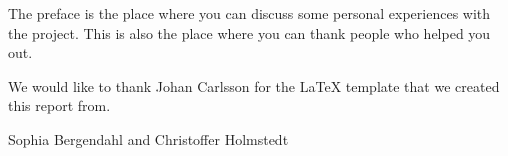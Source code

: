The preface is the place where you can discuss some personal
experiences with the project. This is also the place where you can
thank people who helped you out.


We would like to thank Johan Carlsson for the LaTeX template that we 
created this report from.

\vspace*{2cm}%
\hfill Sophia Bergendahl and Christoffer Holmstedt
